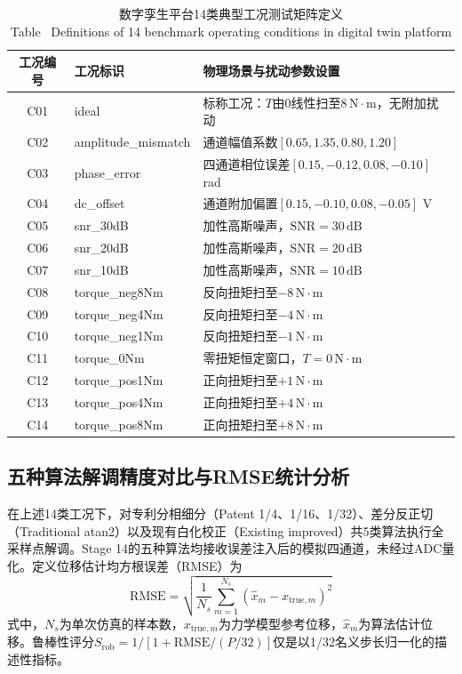 \documentclass[UTF8,a4paper,12pt]{ctexart}
\newcommand{\bitablecaption}[2]{%
  \caption{#1\\[-0.2em]\small Table \thetable\ #2}
}
\begin{document}
\begin{table}[htbp]
  \centering
  \bitablecaption{数字孪生平台14类典型工况测试矩阵定义}{Definitions of 14 benchmark operating conditions in digital twin platform}
  \label{tab:cases}
  \begin{tabular}{cll}
    \toprule
    工况编号 & 工况标识 & 物理场景与扰动参数设置 \\
    \midrule
    C01 & ideal & 标称工况：$T$由$0$线性扫至$8\,\mathrm{N\cdot m}$，无附加扰动 \\
    C02 & amplitude\_mismatch & 通道幅值系数$[0.65,1.35,0.80,1.20]$ \\
    C03 & phase\_error & 四通道相位误差$[0.15,-0.12,0.08,-0.10]$ rad \\
    C04 & dc\_offset & 通道附加偏置$[0.15,-0.10,0.08,-0.05]$ V \\
    C05 & snr\_30dB & 加性高斯噪声，$\mathrm{SNR}=30\,\mathrm{dB}$ \\
    C06 & snr\_20dB & 加性高斯噪声，$\mathrm{SNR}=20\,\mathrm{dB}$ \\
    C07 & snr\_10dB & 加性高斯噪声，$\mathrm{SNR}=10\,\mathrm{dB}$ \\
    C08 & torque\_neg8Nm & 反向扭矩扫至$-8\,\mathrm{N\cdot m}$ \\
    C09 & torque\_neg4Nm & 反向扭矩扫至$-4\,\mathrm{N\cdot m}$ \\
    C10 & torque\_neg1Nm & 反向扭矩扫至$-1\,\mathrm{N\cdot m}$ \\
    C11 & torque\_0Nm & 零扭矩恒定窗口，$T=0\,\mathrm{N\cdot m}$ \\
    C12 & torque\_pos1Nm & 正向扭矩扫至$+1\,\mathrm{N\cdot m}$ \\
    C13 & torque\_pos4Nm & 正向扭矩扫至$+4\,\mathrm{N\cdot m}$ \\
    C14 & torque\_pos8Nm & 正向扭矩扫至$+8\,\mathrm{N\cdot m}$ \\
    \bottomrule
  \end{tabular}
\end{table}

\subsection{五种算法解调精度对比与RMSE统计分析}
在上述14类工况下，对专利分相细分（Patent 1/4、1/16、1/32）、差分反正切（Traditional atan2）以及现有白化校正（Existing improved）共5类算法执行全采样点解调。Stage 14的五种算法均接收误差注入后的模拟四通道，未经过ADC量化。定义位移估计均方根误差（RMSE）为
\begin{equation}
\mathrm{RMSE} = \sqrt{\frac{1}{N_s} \sum_{m=1}^{N_s} \left( \hat{x}_m - x_{\mathrm{true},m} \right)^2 }
\label{eq:rmse}
\end{equation}
式中，$N_s$为单次仿真的样本数，$x_{\mathrm{true},m}$为力学模型参考位移，$\hat{x}_m$为算法估计位移。鲁棒性评分$S_{\mathrm{rob}}=1/[1+\mathrm{RMSE}/(P/32)]$仅是以1/32名义步长归一化的描述性指标。
\end{document}
